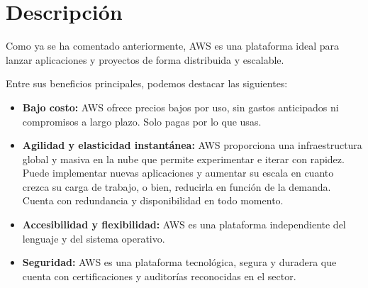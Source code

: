 \section{Descripción}
Como ya se ha comentado anteriormente, AWS es una plataforma ideal para lanzar aplicaciones y proyectos de forma distribuida y escalable.

Entre sus beneficios principales, podemos destacar las siguientes:
\begin{itemize}
	\item \textbf{Bajo costo:} AWS ofrece precios bajos por uso, sin gastos anticipados ni compromisos a largo plazo. Solo pagas por lo que usas.
	\item \textbf{Agilidad y elasticidad instantánea:} AWS proporciona una infraestructura global y masiva en la nube que permite experimentar e iterar con rapidez. Puede implementar nuevas aplicaciones y aumentar su escala en cuanto crezca su carga de trabajo, o bien, reducirla en función de la demanda. Cuenta con redundancia y disponibilidad en todo momento.
	\item \textbf{Accesibilidad y flexibilidad:} AWS es una plataforma independiente del lenguaje y del sistema operativo.
	\item \textbf{Seguridad:} AWS es una plataforma tecnológica, segura y duradera que cuenta con certificaciones y auditorías reconocidas en el sector.
\end{itemize}